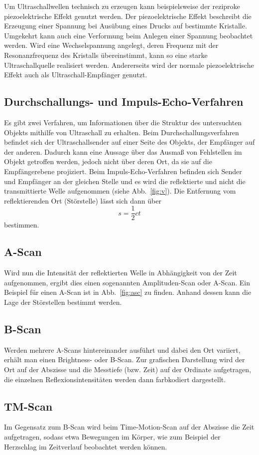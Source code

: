 Um Ultraschallwellen technisch zu erzeugen kann beispielsweise der reziproke piezoelektrische Effekt genutzt werden. Der piezoelektrische Effekt beschreibt die Erzeugung einer Spannung bei Ausübung eines Drucks auf bestimmte Kristalle. Umgekehrt kann auch eine Verformung beim Anlegen einer Spannung beobachtet werden. Wird eine Wechselspannung angelegt, deren Frequenz mit der Resonanzfrequenz des Kristalls übereinstimmt, kann so eine starke Ultraschallquelle realisiert werden. Andererseits wird der normale piezoelektrische Effekt auch als Ultraschall-Empfänger genutzt.

\subsection{Durchschallungs- und Impuls-Echo-Verfahren}
Es gibt zwei Verfahren, um Informationen über die Struktur des untersuchten Objekts mithilfe von Ultraschall zu erhalten. Beim Durchschallungsverfahren befindet sich der Ultraschallsender auf einer Seite des Objekts, der Empfänger auf der anderen. Dadurch kann eine Aussage über das Ausmaß von Fehlstellen im Objekt getroffen werden, jedoch nicht über deren Ort, da sie auf die Empfängerebene projiziert. Beim Impuls-Echo-Verfahren befinden sich Sender und Empfänger an der gleichen Stelle und es wird die reflektierte und nicht die transmittierte Welle aufgenommen (siehe Abb.~\ref{fig:v}). Die Entfernung vom reflektierenden Ort (Störstelle) lässt sich dann über
\begin{equation}
  \label{eqn}
  s = \frac{1}{2} c t
\end{equation}
bestimmen.
\subsection{A-Scan}
Wird nun die Intensität der reflektierten Welle in Abhängigkeit von der Zeit aufgenommen, ergibt dies einen sogenannten Amplituden-Scan oder A-Scan. Ein Beispiel für einen A-Scan ist in Abb.~\ref{fig:asc} zu finden. Anhand dessen kann die Lage der Störstellen bestimmt werden.
\subsection{B-Scan}
Werden mehrere A-Scans hintereinander ausführt und dabei den Ort variiert, erhält man einen Brightness- oder B-Scan. Zur grafischen Darstellung wird der Ort auf der Abszisse und die Messtiefe (bzw. Zeit) auf der Ordinate aufgetragen, die einzelnen Reflexionsintensitäten werden dann farbkodiert dargestellt.
\subsection{TM-Scan}
Im Gegensatz zum B-Scan wird beim Time-Motion-Scan auf der Abszisse die Zeit aufgetragen, sodass etwa Bewegungen im Körper, wie zum Beispiel der Herzschlag im Zeitverlauf beobachtet werden können.
